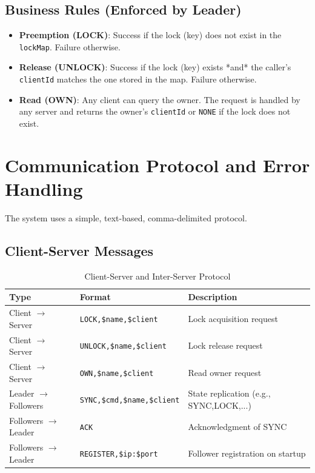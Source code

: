 \documentclass[a4paper,11pt]{article}
\begin{document}
\subsection*{Business Rules (Enforced by Leader)}
\begin{itemize}
    \item \textbf{Preemption (LOCK)}: Success if the lock (key) does not exist in the \texttt{lockMap}. Failure otherwise.
    \item \textbf{Release (UNLOCK)}: Success if the lock (key) exists *and* the caller's \texttt{clientId} matches the one stored in the map. Failure otherwise.
    \item \textbf{Read (OWN)}: Any client can query the owner. The request is handled by any server and returns the owner's \texttt{clientId} or \texttt{NONE} if the lock does not exist.
\end{itemize}

\section{Communication Protocol and Error Handling}
The system uses a simple, text-based, comma-delimited protocol.

\subsection*{Client-Server Messages}
\begin{table}[htbp]
\centering
\caption{Client-Server and Inter-Server Protocol}
\label{tab:protocol}
\begin{tabular}{@{}lll@{}}
\toprule
\textbf{Type} & \textbf{Format} & \textbf{Description} \\
\midrule
Client $\rightarrow$ Server & \texttt{LOCK,\$name,\$client} & Lock acquisition request \\
Client $\rightarrow$ Server & \texttt{UNLOCK,\$name,\$client} & Lock release request \\
Client $\rightarrow$ Server & \texttt{OWN,\$name,\$client} & Read owner request \\
Leader $\rightarrow$ Followers & \texttt{SYNC,\$cmd,\$name,\$client} & State replication (e.g., SYNC,LOCK,...) \\
Followers $\rightarrow$ Leader & \texttt{ACK} & Acknowledgment of SYNC \\
Followers $\rightarrow$ Leader & \texttt{REGISTER,\$ip:\$port} & Follower registration on startup \\
\bottomrule
\end{tabular}
\end{table}
\end{document}
